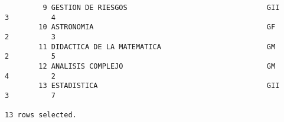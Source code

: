 \documentclass[11pt]{report}
\begin{document}
\begin{verbatim}
         9 GESTION DE RIESGOS                                 GII           3          4                                                                                                                
        10 ASTRONOMIA                                         GF            2          3                                                                                                                
        11 DIDACTICA DE LA MATEMATICA                         GM            2          5                                                                                                                
        12 ANALISIS COMPLEJO                                  GM            4          2                                                                                                                
        13 ESTADISTICA                                        GII           3          7                                                                                                                

13 rows selected.
  \end{verbatim}

\end{document}
